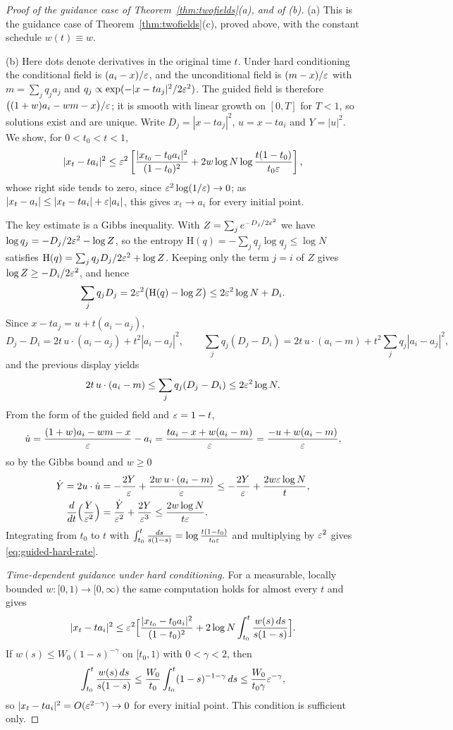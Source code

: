 \documentclass{article} %
\theoremstyle{plain}
\theoremstyle{definition}
\theoremstyle{remark}
\begin{document}
\begin{proof}[Proof of the guidance case of Theorem~\ref{thm:twofields}(a), and of (b)]
(a) This is the guidance case of Theorem~\ref{thm:twofields}(c), proved above, with the constant schedule $w(t)\equiv w$.

(b) Here dots denote derivatives in the original time $t$. Under hard conditioning the conditional
field is $(a_i-x)/\varepsilon$, and the unconditional field is $(m-x)/\varepsilon$ with $m=\sum_jq_ja_j$ and
$q_j\propto\exp(-|x-ta_j|^2/2\varepsilon^2)$. The guided field is therefore
$\bigl((1+w)a_i-wm-x\bigr)/\varepsilon$; it is smooth with linear growth on $[0,T]$ for $T<1$, so solutions
exist and are unique. Write $D_j=|x-ta_j|^2$, $u=x-ta_i$ and $Y=|u|^2$. We show, for
$0<t_0<t<1$,
\begin{equation}
|x_t-ta_i|^2\le\varepsilon^2\left[\frac{|x_{t_0}-t_0a_i|^2}{(1-t_0)^2}
+2w\log N\log\frac{t(1-t_0)}{t_0\varepsilon}\right],
\label{eq:guided-hard-rate}
\end{equation}
whose right side tends to zero, since $\varepsilon^2\log(1/\varepsilon)\to0$; as
$|x_t-a_i|\le|x_t-ta_i|+\varepsilon|a_i|$, this gives $x_t\to a_i$ for every initial point.

The key estimate is a Gibbs inequality. With $Z=\sum_je^{-D_j/2\varepsilon^2}$ we have
$\log q_j=-D_j/2\varepsilon^2-\log Z$, so the entropy $\mathrm H(q)=-\sum_jq_j\log q_j\le\log N$ satisfies
$\mathrm H(q)=\sum_jq_jD_j/2\varepsilon^2+\log Z$. Keeping only the term $j=i$ of $Z$ gives
$\log Z\ge-D_i/2\varepsilon^2$, and hence
\[
\sum_jq_jD_j=2\varepsilon^2\bigl(\mathrm H(q)-\log Z\bigr)\le2\varepsilon^2\log N+D_i .
\]
Since $x-ta_j=u+t(a_i-a_j)$,
\[
D_j-D_i=2t\,u\cdot(a_i-a_j)+t^2|a_i-a_j|^2,\qquad
\sum_jq_j(D_j-D_i)=2t\,u\cdot(a_i-m)+t^2\sum_jq_j|a_i-a_j|^2,
\]
and the previous display yields
\[
2t\,u\cdot(a_i-m)\le\sum_jq_j(D_j-D_i)\le2\varepsilon^2\log N .
\]
From the form of the guided field and $\varepsilon=1-t$,
\[
\dot u=\frac{(1+w)a_i-wm-x}{\varepsilon}-a_i=\frac{ta_i-x+w(a_i-m)}{\varepsilon}=\frac{-u+w(a_i-m)}{\varepsilon},
\]
so by the Gibbs bound and $w\ge0$
\begin{align*}
\dot Y=2u\cdot\dot u&=-\frac{2Y}{\varepsilon}+\frac{2w\,u\cdot(a_i-m)}{\varepsilon}
\le-\frac{2Y}{\varepsilon}+\frac{2w\varepsilon\log N}{t},\\
\frac{d}{dt}\Bigl(\frac{Y}{\varepsilon^2}\Bigr)&=\frac{\dot Y}{\varepsilon^2}+\frac{2Y}{\varepsilon^3}
\le\frac{2w\log N}{t\varepsilon} .
\end{align*}
Integrating from $t_0$ to $t$ with $\int_{t_0}^t\frac{ds}{s(1-s)}=\log\frac{t(1-t_0)}{t_0\varepsilon}$ and
multiplying by $\varepsilon^2$ gives \eqref{eq:guided-hard-rate}.

\emph{Time-dependent guidance under hard conditioning.} For a measurable, locally bounded
$w:[0,1)\to[0,\infty)$ the same computation holds for almost every $t$ and gives
\[
|x_t-ta_i|^2\le\varepsilon^2\Bigl[\frac{|x_{t_0}-t_0a_i|^2}{(1-t_0)^2}
+2\log N\int_{t_0}^t\frac{w(s)\,ds}{s(1-s)}\Bigr].
\]
If $w(s)\le W_0(1-s)^{-\gamma}$ on $[t_0,1)$ with $0<\gamma<2$, then
\[
\int_{t_0}^t\frac{w(s)\,ds}{s(1-s)}\le\frac{W_0}{t_0}\int_{t_0}^t(1-s)^{-1-\gamma}\,ds
\le\frac{W_0}{t_0\gamma}\varepsilon^{-\gamma},
\]
so $|x_t-ta_i|^2=O(\varepsilon^{2-\gamma})\to0$ for every initial point. This condition is sufficient
only.
\end{proof}
\end{document}

